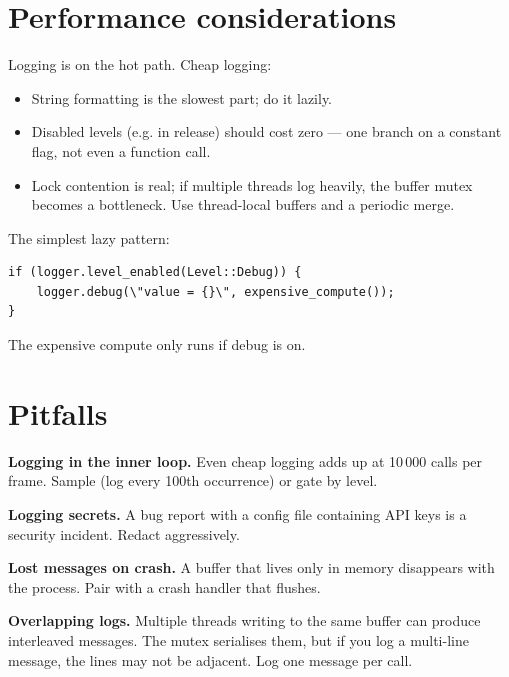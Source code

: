 \section{Performance considerations}

Logging is on the hot path. Cheap logging:

\begin{itemize}[leftmargin=*]
  \item String formatting is the slowest part; do it lazily.
  \item Disabled levels (e.g.  in release) should
    cost zero --- one branch on a constant flag, not even a
    function call.
  \item Lock contention is real; if multiple threads log
    heavily, the buffer mutex becomes a bottleneck. Use
    thread-local buffers and a periodic merge.
\end{itemize}

The simplest lazy pattern:

\begin{lstlisting}
if (logger.level_enabled(Level::Debug)) {
    logger.debug(\"value = {}\", expensive_compute());
}
\end{lstlisting}

The expensive compute only runs if debug is on.

\section{Pitfalls}

\begin{warning}
\textbf{Logging in the inner loop.} Even cheap logging adds up
at 10\,000 calls per frame. Sample (log every 100th occurrence)
or gate by level.
\end{warning}

\begin{warning}
\textbf{Logging secrets.} A bug report with a config file
containing API keys is a security incident. Redact aggressively.
\end{warning}

\begin{warning}
\textbf{Lost messages on crash.} A buffer that lives only in
memory disappears with the process. Pair with a crash handler
that flushes.
\end{warning}

\begin{warning}
\textbf{Overlapping logs.} Multiple threads writing to the
same buffer can produce interleaved messages. The mutex
serialises them, but if you log a multi-line message, the
lines may not be adjacent. Log one message per call.
\end{warning}

